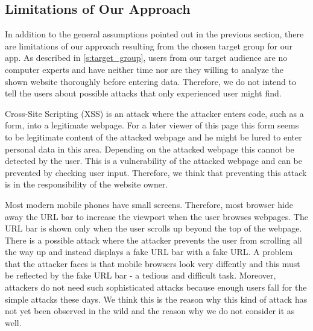 \subsection{Limitations of Our Approach}
In addition to the general assumptions pointed out in the previous section, there are limitations of our approach resulting from the chosen target group for our app.
As described in \autoref{s:target_group}, users from our target audience are no computer experts and have neither time nor are they willing to analyze the shown website thoroughly before entering data.
Therefore, we do not intend to tell the users about possible attacks that only experienced user might find.
\begin{description}[leftmargin=0cm]
	\item[Cross-Site Scripting]
	Cross-Site Scripting (XSS) is an attack where the attacker enters code, such as a form, into a legitimate webpage.
	For a later viewer of this page this form seems to be legitimate content of the attacked webpage and he might be lured to enter personal data in this area. 
	Depending on the attacked webpage this cannot be detected by the user.
	This is a vulnerability of the attacked webpage and can be prevented by checking user input.
	Therefore, we think that preventing this attack is in the responsibility of the website owner.
	\item[URL Hiding Techniques]
	Most modern mobile phones have small screens.
	Therefore, most browser hide away the URL bar to increase the viewport when the user browses webpages.
	The URL bar is shown only when the user scrolls up beyond the top of the webpage.
	There is a possible attack where the attacker prevents the user from scrolling all the way up and instead displays a fake URL bar with a fake URL.
	A problem that the attacker faces is that mobile browsers look very diffently and this must be reflected by the fake URL bar - a tedious and difficult task.
	Moreover, attackers do not need such sophisticated attacks because enough users fall for the simple attacks these days. 
	We think this is the reason why this kind of attack has not yet been observed in the wild and the reason why we do not consider it as well.
\end{description}

